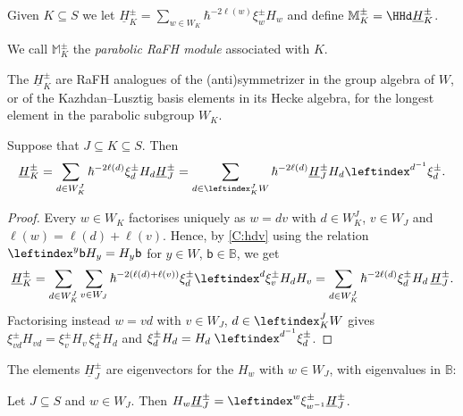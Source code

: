 \documentclass[a4paper,11pt]{amsart}
\numberwithin{equation}{subsection}
\theoremstyle{definition}
\theoremstyle{theorem}
\theoremstyle{remark}
\newcommand\HJ{\underline{H}}
\newcommand\MJ{\mathbb{M}}
\newcommand\HJpm{\underline{H}^\pm}
\newcommand\Sym{W}
\newcommand\bb{\mathsf{b}}
\newcommand{\Bo}{\mathbb{B}}
\begin{document}
\begin{Definition}\label{D:HJ}
  Given  $K\subseteq S$ we let
  $\HJ_K^\pm = \sum_{w\in\Sym_K}\hbar^{-2\ell(w)}\xi^\pm_w H_w$ and define
  $\MJ^\pm_K = \HHd\HJ_K^\pm$.
\end{Definition}
We call $\MJ^\pm_K$ the \emph{parabolic RaFH module}  associated with $K$.

\begin{Remark}
The $\HJ_K^\pm$ are RaFH analogues of the (anti)symmetrizer in the group algebra of $W$, or of the Kazhdan--Lusztig basis elements in its Hecke algebra, for the longest element in the parabolic subgroup $W_K$.
\end{Remark}


 \begin{Lemma}\label{L:HJK}
   Suppose that $J\subseteq K\subseteq S$. Then
   \[
     \HJpm_K = \sum_{d\in\Sym^J_K}\hbar^{-2\ell(d)}\xi^\pm_d H_d\HJpm_J
      = \sum_{d\in\leftindex^J_K W}\hbar^{-2\ell(d)}\HJpm_J H_d
        \leftindex^{d^{-1}}{{\xi^\pm_d}}.\]
 \end{Lemma}

 \begin{proof}
    Every $w\in\Sym_K$ factorises uniquely as $w=dv$ with $d\in\Sym^J_K$,
    $v\in\Sym_J$ and $\ell(w)=\ell(d)+\ell(v)$. Hence, by \autoref{C:hdv} using the relation $ \leftindex^y\bb H_y=H_y\bb$ for $y\in\Sym$, $\bb\in\Bo$, we get
    \[
      \HJ_K^\pm=\sum_{d\in\Sym^J_K}\sum_{v\in\Sym_J}
        \hbar^{-2(\ell(d)+\ell(v))}\xi^\pm_d\leftindex^d{{\xi^\pm_v}}H_dH_v
      =\sum_{d\in\Sym^J_K}\hbar^{-2\ell(d)}\xi^\pm_dH_d\,\HJpm_J .
    \]
    Factorising instead $w=vd$ with $v\in\Sym_J$, $d\in\leftindex^J_KW$ gives
    $\xi^\pm_{vd}H_{vd}=\xi^\pm_vH_v\,\xi^\pm_dH_d$ and
    $\xi^\pm_dH_d=H_d\;\leftindex^{d^{-1}}{{\xi^\pm_d}}$.
 \end{proof}

 The elements $\HJ^\pm_J$ are eigenvectors for the $H_w$ with $w\in\Sym_J$, with eigenvalues in $\Bo$:
 \begin{Theorem}\label{P:HW}
Let $J\subseteq S$ and  $w\in\Sym_J$. Then
   $H_w\HJ_J^\pm = \leftindex^w{{\xi^\pm_{w^{-1}}}}\HJ_J^\pm$.
 \end{Theorem}
\end{document}
